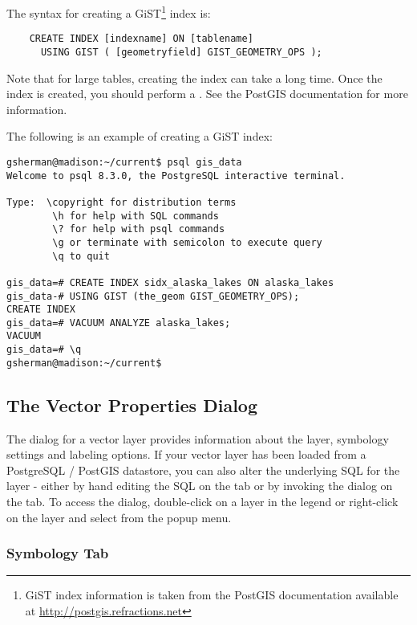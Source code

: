 The syntax for creating a GiST\footnote{GiST index information is taken from the PostGIS
documentation available at \url{http://postgis.refractions.net}}
index is:

\begin{verbatim}
    CREATE INDEX [indexname] ON [tablename] 
      USING GIST ( [geometryfield] GIST_GEOMETRY_OPS );
\end{verbatim}

Note that for large tables, creating the index can take a long time. Once the
index is created, you should perform a . See the
PostGIS documentation \cite{PostGISweb} for more information.

The following is an example of creating a GiST index:
\begin{verbatim}
gsherman@madison:~/current$ psql gis_data
Welcome to psql 8.3.0, the PostgreSQL interactive terminal.

Type:  \copyright for distribution terms
        \h for help with SQL commands
        \? for help with psql commands
        \g or terminate with semicolon to execute query
        \q to quit

gis_data=# CREATE INDEX sidx_alaska_lakes ON alaska_lakes
gis_data-# USING GIST (the_geom GIST_GEOMETRY_OPS);
CREATE INDEX
gis_data=# VACUUM ANALYZE alaska_lakes;
VACUUM
gis_data=# \q
gsherman@madison:~/current$
\end{verbatim}

\subsection{The Vector Properties Dialog}\label{sec:vectorprops}

The  dialog for a vector layer 
provides information about the layer, symbology
settings and labeling options. If your vector layer has been loaded from a
PostgreSQL / PostGIS datastore, you can also alter the underlying SQL for the
layer - either by hand editing the SQL on the  tab or by
invoking the  dialog on the  tab. 
To access the
 dialog, double-click on a layer in the legend or right-click on the
layer and select  from the popup menu.

\subsubsection{Symbology Tab}\label{sec:symbology}

